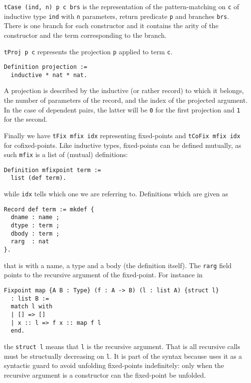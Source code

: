 \texttt{tCase (ind, n) p c brs} is the representation of the
pattern-matching on \texttt{c} of inductive type \texttt{ind}
with \texttt{n} parameters, return predicate \texttt{p}
and branches \texttt{brs}.
There is one branch for each constructor and it contains the arity of the
constructor and the term corresponding to the branch.

\texttt{tProj p c} represents the projection \texttt{p}
applied to term \texttt{c}.
\begin{verbatim}
Definition projection :=
  inductive * nat * nat.
\end{verbatim}
A projection is described by the inductive (or rather record) to which it
belongs, the number of parameters of the record, and the index of the projected
argument. In the case of dependent pairs, the latter will be \texttt{0}
for the first projection and \texttt{1} for the second.

Finally we have \texttt{tFix mfix idx} representing fixed-points and
\texttt{tCoFix mfix idx} for cofixed-points.
Like inductive types, fixed-points can be defined mutually, as such
\texttt{mfix} is a list of (mutual) definitions:
\begin{verbatim}
Definition mfixpoint term :=
  list (def term).
\end{verbatim}
while \texttt{idx} tells which one we are referring to.
Definitions which are given as
\begin{verbatim}
Record def term := mkdef {
  dname : name ;
  dtype : term ;
  dbody : term ;
  rarg  : nat
}.
\end{verbatim}
that is with a name, a type and a body (the definition itself).
The \texttt{rarg} field points to the recursive argument of the
fixed-point.
For instance in
\begin{verbatim}
Fixpoint map {A B : Type} (f : A -> B) (l : list A) {struct l}
  : list B :=
  match l with
  | [] => []
  | x :: l => f x :: map f l
  end.
\end{verbatim}
the \texttt{{struct l}} means that \texttt{l} is the recursive
argument. That is all recursive calls must be structually decreasing on
\texttt{l}. It is part of the syntax because \Coq uses it as a
syntactic guard to avoid unfolding fixed-points indefinitely: only when the
recursive argument is a constructor can the fixed-point be unfolded.

